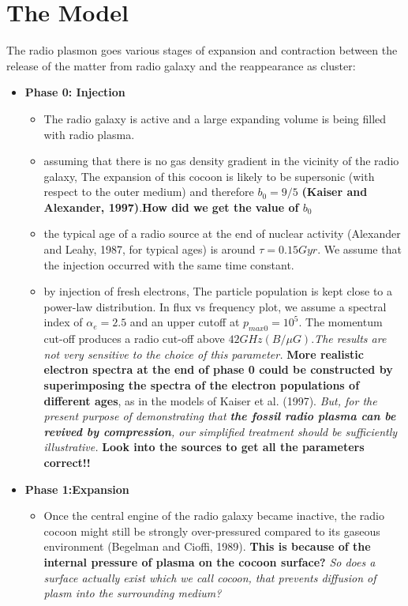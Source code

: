 \documentclass[12pt]{report}
\newcommand{\tbf}[1]{\textbf{#1}}
\newcommand{\tit}[1]{\textit{#1}}
\begin{document}
\section{The Model}
The radio plasmon goes various stages of expansion and contraction between the release of the matter from radio galaxy and the reappearance as cluster:
\begin{itemize}
\item \tbf{Phase 0: Injection}
\begin{itemize}
\item The radio galaxy is active and a large expanding volume is being filled with radio plasma.
\item assuming that there is no gas density gradient in the vicinity of the radio galaxy, The expansion of this cocoon is likely to be supersonic (with respect to the outer medium) and therefore $b_0 = 9/5$ \tbf{(Kaiser and Alexander, 1997)}.\tbf{How did we get the value of $b_0$}
\item the typical age of a radio source at the end of nuclear activity (Alexander and Leahy, 1987, for typical ages) is around $\tau=0.15 Gyr$. We assume that the injection occurred with the same time constant.
\item by injection of fresh electrons, The particle population is kept close to a power-law distribution. In flux vs frequency plot, we assume a  spectral index of $\alpha_e = 2.5$ and an upper cutoff at $p_{max0} = 10^5$. The momentum cut-off produces a radio cut-off above $42GHz(B/\mu G)$.\tit{The results are not very sensitive to the choice of this parameter.} \tbf{ More realistic electron spectra at the end of phase 0 could be constructed by superimposing the spectra of the electron populations of different ages}, as in the models of Kaiser et al. (1997). \tit{But, for the present purpose of demonstrating that \tbf{the fossil radio plasma can be revived by compression}, our simplified treatment should be sufficiently illustrative. }\tbf{Look into the sources to get all the parameters correct!!}
\end{itemize}
\item \tbf{Phase 1:Expansion}
\begin{itemize}
\item Once the central engine of the radio galaxy became inactive, the radio cocoon might still be strongly over-pressured compared to its gaseous environment (Begelman and Cioffi, 1989). \textbf{This is because of the internal pressure of plasma on the cocoon surface?}\tit{ So does a surface actually exist which we call cocoon, that prevents diffusion of plasm into the surrounding medium?}

\end{itemize}
\end{itemize}
\end{document}
